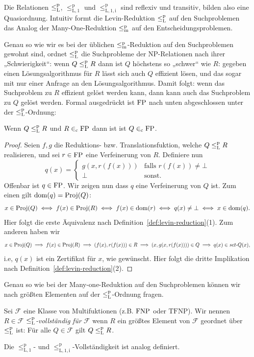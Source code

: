 Die Relationen $\leq_\mathrm{L}^\mathrm{p}$, $\leq_\mathrm{L,1}^\mathrm p$ und $\leq_\mathrm{L,1,i}^\mathrm p$ sind reflexiv und transitiv, bilden also eine Quasiordnung.
Intuitiv formt die Levin-Reduktion $\leq_\mathrm{L}^\mathrm{p}$ auf den Suchproblemen das Analog der Many-One-Reduktion $\leq_\mathrm{m}^\mathrm{p}$ auf den Entscheidungsproblemen.

Genau so wie wir es bei der üblichen $\leq_\mathrm{m}^\mathrm{p}$-Reduktion auf den Suchproblemen gewohnt sind, ordnet $\leq_\mathrm{L}^\mathrm{p}$ die Suchprobleme der NP-Relationen nach ihrer „Schwierigkeit“: wenn $Q\leq_\mathrm{L}^\mathrm{p} R$ dann ist $Q$ höchstens so „schwer“ wie $R$: gegeben einen Lösungsalgorithmus für $R$ lässt sich auch $Q$ effizient lösen, und das sogar mit nur einer Anfrage an den Lösungsalgorithmus. Damit folgt: wenn das Suchproblem zu $R$ effizient gelöst werden kann, dann kann auch das Suchproblem zu $Q$ gelöst werden.
Formal ausgedrückt ist $\mathrm{FP}$ nach unten abgeschlossen unter der $\leq_\mathrm{L}^\mathrm{p}$-Ordnung:

\begin{lemma}
    Wenn $Q\leq_\mathrm{L}^\mathrm{p} R$ und $R\in_\mathrm{c}\mathrm{FP}$ dann ist ist $Q\in_\mathrm{c} \mathrm{FP}$.
\end{lemma}
\begin{proof}
    Seien $f,g$ die Reduktions- bzw. Translationsfuktion, welche $Q\leq_\mathrm{L}^\mathrm{p} R$ realisieren, und sei $r\in\mathrm{FP}$ eine Verfeinerung von $R$.
    Definiere nun
    \[ q(x) = \begin{cases} g(x, r(f(x))) & \text{falls $r(f(x))\neq \bot$} \\ \bot & \text{sonst}.\end{cases} \]
    Offenbar ist $q\in\mathrm{FP}$. Wir zeigen nun dass $q$ eine Verfeinerung von $Q$ ist.
    Zum einen gilt $\operatorname{dom}(q)=\operatorname{Proj}(Q)$:
    \[ x\in\operatorname{Proj}(Q) \iff f(x)\in\operatorname{Proj}(R) \iff f(x)\in\operatorname{dom}(r) \iff q(x)\neq\bot \iff x\in\operatorname{dom}(q). \]
    Hier folgt die erste Äquivalenz nach Definition~\ref{def:levin-reduction}(1).
    Zum anderen haben wir
    \[ x\in\operatorname{Proj}(Q) \implies f(x)\in\operatorname{Proj}(R) \implies (f(x), r(f(x)))\in R \implies (x, g(x, r(f(x))))\in Q \implies q(x)\in\mathit{set}\text{-}{}Q(x), \]
    i.e, $q(x)$ ist ein Zertifikat für $x$, wie gewünscht. Hier folgt die dritte Implikation nach Definition~\ref{def:levin-reduction}(2).
\end{proof}

Genau so wie bei der Many-one-Reduktion auf den Suchproblemen können wir nach größten Elementen auf der $\leq_\mathrm{L}^\mathrm{p}$-Ordnung fragen.

\begin{definition}
    Sei $\mathcal F$ eine Klasse von Multifuktionen (z.B. $\mathrm{FNP}$ oder $\mathrm{TFNP}$).
    Wir nennen $R\in\mathcal F$ \emph{$\leq_\mathrm{L}^\mathrm{p}$-vollständig für $\mathcal F$} wenn $R$ ein größtes Element von $\mathcal F$ geordnet über $\leq_\mathrm{L}^\mathrm{p}$ ist:
    Für alle $Q\in\mathcal F$ gilt $Q\leq_\mathrm{L}^\mathrm{p} R$.

    Die $\leq_\mathrm{L,1}^\mathrm p$- und $\leq_\mathrm{L,1,i}^\mathrm p$-Vollständigkeit ist analog definiert.
\end{definition}

